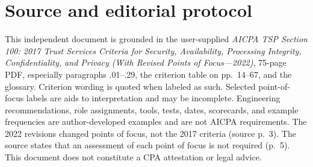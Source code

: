 \documentclass[10pt,oneside]{report}
\begin{document}
\chapter*{Source and editorial protocol}
This independent document is grounded in the user-supplied \emph{AICPA TSP Section 100: 2017 Trust Services Criteria for Security, Availability, Processing Integrity, Confidentiality, and Privacy (With Revised Points of Focus---2022)}, 75-page PDF, especially paragraphs .01--.29, the criterion table on pp.~14--67, and the glossary. Criterion wording is quoted when labeled as such. Selected point-of-focus labels are aids to interpretation and may be incomplete. Engineering recommendations, role assignments, tools, tests, dates, scorecards, and example frequencies are author-developed examples and are not AICPA requirements. The 2022 revisions changed points of focus, not the 2017 criteria (source p.~3). The source states that an assessment of each point of focus is not required (p.~5). This document does not constitute a CPA attestation or legal advice.
\end{document}
